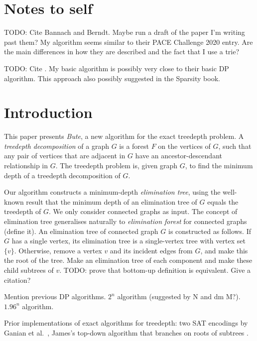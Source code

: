 \section{Notes to self}

TODO: Cite Bannach and Berndt.  Maybe run a draft of the paper I'm writing past them?
My algorithm seems similar to their PACE Challenge 2020 entry.  Are the main differences in
how they are described and the fact that I use a trie?

TODO: Cite \cite{DBLP:journals/algorithmica/FominGP15}.  My basic algorithm is possibly
very close to their basic DP algorithm.  This approach also possibly suggested in the
Sparsity book.

\section{Introduction}

This paper presents \emph{Bute}, a new algorithm for the exact treedepth problem.
A \emph{treedepth decomposition} of a graph $G$ is a forest $F$ on the vertices
of $G$, such that any pair of vertices that are adjacent in $G$ have an ancestor-descendant
relationship in $G$.  The treedepth problem is, given graph $G$, to find the minimum depth of a 
treedepth decomposition of $G$.

Our algorithm constructs a minimum-depth \emph{elimination tree}, using the well-known
result that the minimum depth of an elimination tree of $G$ equals the treedepth of $G$.
We only consider connected graphs as input.  The concept of elimination tree generalises
naturally to \emph{elimination forest} for connected graphs (define it).
An elimination tree of connected graph $G$ is constructed as follows.  If $G$ has
a single vertex, its elimination tree is a single-vertex tree with vertex
set $\{v\}$.  Otherwise, remove a vertex
$v$ and its incident edges from $G$, and make this the root of the tree.  
Make an elimination tree of each component and make these child subtrees
of $v$.
TODO: prove that bottom-up definition is equivalent.  Give a citation?

Mention previous DP algorithms.  $2^n$ algorithm (suggested by N and dm M?).
$1.96^n$ algorithm.

Prior implementations of exact algorithms for treedepth:
two SAT encodings by Ganian et al.\ \cite{DBLP:conf/alenex/GanianLOS19,DBLP:journals/corr/abs-1911-12995},
James's top-down algorithm that branches on roots of subtrees \cite{DBLP:conf/wea/000120a}.

